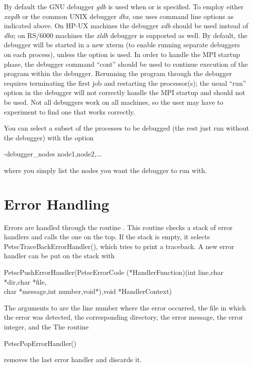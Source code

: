 {{{By default the GNU debugger {\em gdb} is used when 
or  is specified. 
To employ either {\em xxgdb} or the common UNIX debugger {\em dbx}, one uses
command line options as indicated above. On HP-UX machines the debugger
{\em xdb} should be used instead of {\em dbx}; on RS/6000 machines the
{\em xldb} debugger is supported as well.
By  default, the debugger will be started in a new xterm (to enable 
running separate debuggers on each process), unless the option 
 is used.
In order to handle the MPI startup phase, the debugger command ``cont'' 
should be used to continue execution of the program within the debugger.
Rerunning the program through the debugger requires terminating 
the first job and restarting the processor(s); the usual ``run'' 
option in the debugger will not correctly handle the MPI startup and
should not be used.  Not all debuggers work on all machines, so the user
may have to experiment to find one that works correctly.

You can select a subset of the processes to be debugged (the rest just run 
without the debugger) with the option
\begin{tabbing}
  -debugger\_nodes node1,node2,...
\end{tabbing}
where you simply list the nodes you want the debugger to run with.

\section{Error Handling}   

Errors are handled through the routine . 
 This routine
checks a stack of error handlers and calls the one on the top.  
If the stack is empty, it selects PetscTraceBackErrorHandler(), 
which  tries to print a traceback. 
A new error handler can be put on the stack with
\begin{tabbing}
  PetscPushErrorHandler(PetscErrorCode (*HandlerFunction)(int line,char *dir,char *file,\\
                                char *message,int number,void*),void *HandlerContext)
\end{tabbing}
The arguments to  are the line number where 
the error occurred, the file in which the error was detected, the corresponding
directory, the error message, the error integer, and the 
The routine 
\begin{tabbing} 
  PetscPopErrorHandler()
\end{tabbing}
removes the last error handler and discards it. 

}}}
